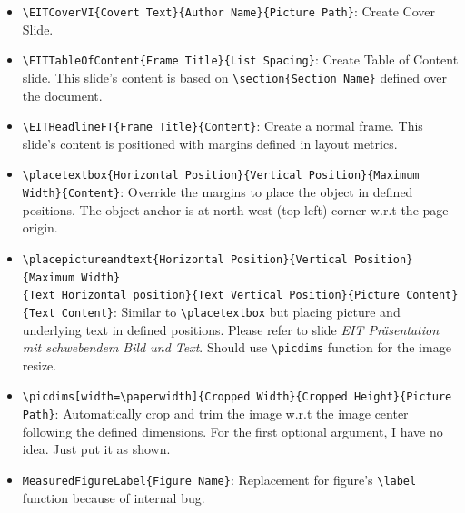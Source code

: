 \documentclass[10pt,landscape]{article}
\makeatletter
\renewcommand{\section}{\@startsection{section}{1}{0mm}%
                                {-1ex plus -.5ex minus -.2ex}%
                                {0.5ex plus .2ex}%
                                {\normalfont\large\bfseries}}
\makeatother
\begin{document}
\begin{multicols}{2}
\begin{itemize}
  \item \verb!\EITCoverVI{Covert Text}{Author Name}{Picture Path}!: Create Cover Slide.
  \item \verb!\EITTableOfContent{Frame Title}{List Spacing}!: Create Table of Content slide. This slide's content is based on \verb!\section{Section Name}! defined over the document.
  \item \verb!\EITHeadlineFT{Frame Title}{Content}!: Create a normal frame. This slide's content is positioned with margins defined in layout metrics.
  \item \verb!\placetextbox{Horizontal Position}{Vertical Position}{Maximum Width}{Content}!: Override the margins to place the object in defined positions. The object anchor is at north-west (top-left) corner w.r.t the page origin.
  \item \verb!\placepictureandtext{Horizontal Position}{Vertical Position}{Maximum Width}!\\\verb!{Text Horizontal position}{Text Vertical Position}{Picture Content}{Text Content}!: Similar to \verb!\placetextbox! but
  placing picture and underlying text in defined positions. Please refer to slide \emph{EIT Präsentation mit schwebendem Bild und Text}. Should use \verb!\picdims! function for the image resize.
  \item \verb!\picdims[width=\paperwidth]{Cropped Width}{Cropped Height}{Picture Path}!: Automatically crop and trim the image w.r.t the image center following the defined dimensions. For the first optional argument, I have no idea. Just put it as shown.
  \item \verb!MeasuredFigureLabel{Figure Name}!: Replacement for figure's \verb!\label! function because of internal bug.
\end{itemize}


\end{multicols}
\end{document}
